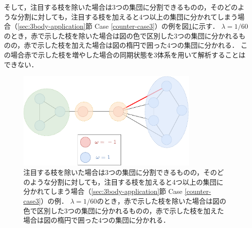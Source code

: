 \documentclass[../main]{subfiles}
\begin{document}
そして，注目する枝を除いた場合は3つの集団に分割できるものの，そのどのような分割に対しても，注目する枝を加えると4つ以上の集団に分かれてしまう場合（\ref{sec:3body-application}節 Case \ref{counter-case3}）の例を図\ref{fig:3body-counter3}に示す．
$\lambda=1/60$のとき，赤で示した枝を除いた場合は図の色で区別した3つの集団に分かれるものの，赤で示した枝を加えた場合は図の楕円で囲った4つの集団に分かれる．
この場合赤で示した枝を増やした場合の同期状態を3体系を用いて解析することはできない．

\begin{figure}[tbp]
    \centering
    \includegraphics[width=90mm]{./images/three-body-counter3.pdf}
    \centering
    \caption{注目する枝を除いた場合は3つの集団に分割できるものの，そのどのような分割に対しても，注目する枝を加えると4つ以上の集団に分かれてしまう場合（\ref{sec:3body-application}節 Case \ref{counter-case3}）の例．
    $\lambda=1/60$のとき，赤で示した枝を除いた場合は図の色で区別した3つの集団に分かれるものの，赤で示した枝を加えた場合は図の楕円で囲った4つの集団に分かれる．}
    \label{fig:3body-counter3}
\end{figure}
 
\end{document}

